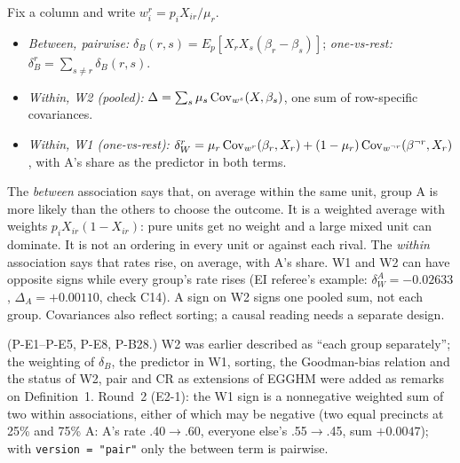 Fix a column and write $w^r_i=p_iX_{ir}/\mu_r$.
\begin{itemize}[nosep]
\item \emph{Between, pairwise:} $\delta_B(r,s)=E_p[X_rX_s(\beta_r-\beta_s)]$;
\emph{one-vs-rest:} $\delta^r_B=\sum_{s\ne r}\delta_B(r,s)$.
\item \emph{Within, W2 (pooled):} $\Delta=\sum_s\mu_s\operatorname{Cov}_{w^s}(X,\beta_s)$, one
sum of row-specific covariances.
\item \emph{Within, W1 (one-vs-rest):}
$\delta^r_W=\mu_r\operatorname{Cov}_{w^r}(\beta_r,X_r)+(1-\mu_r)\operatorname{Cov}_{w^{\neg r}}(\beta^{\neg r},X_r)$,
with A's share as the predictor in both terms.
\end{itemize}
\begin{plain}
The \emph{between} association says that, on average within the same unit, group
A is more likely than the others to choose the outcome. It is a weighted average
with weights $p_iX_{ir}(1-X_{ir})$: pure units get no weight and a large mixed
unit can dominate. It is not an ordering in every unit or against each rival. The
\emph{within} association says that rates rise, on average, with A's share. W1 and
W2 can have opposite signs while every group's rate rises (EI referee's example:
$\delta^A_W=-0.02633$, $\Delta_A=+0.00110$, check C14). A sign on W2 signs one
pooled sum, not each group. Covariances also reflect sorting; a causal reading
needs a separate design.
\end{plain}
\begin{revnote}
(P-E1--P-E5, P-E8, P-B28.) W2 was earlier described as ``each group
separately''; the weighting of $\delta_B$, the predictor in W1, sorting, the
Goodman-bias relation and the status of W2, pair and CR as extensions of EGGHM
were added as remarks on Definition~1.
Round~2 (E2-1): the W1 sign is a nonnegative weighted sum of two within
associations, either of which may be negative (two equal precincts at 25\% and
75\% A: A's rate .40$\to$.60, everyone else's .55$\to$.45, sum $+0.0047$); with
\texttt{version = "pair"} only the between term is pairwise.
\end{revnote}

